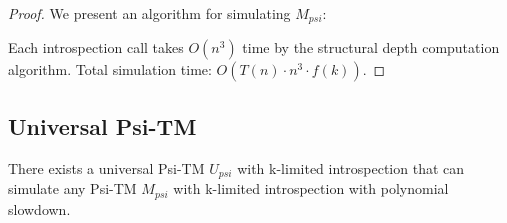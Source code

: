 \begin{proof}
We present an algorithm for simulating $M_{psi}$:

\begin{figure}[ht]
\end{figure}

Each introspection call takes $O(n^3)$ time by the structural depth computation algorithm. Total simulation time: $O(T(n) \cdot n^3 \cdot f(k))$.
\end{proof}

\subsection{Universal Psi-TM}

\begin{theorem}
There exists a universal Psi-TM $U_{psi}$ with k-limited introspection that can simulate any Psi-TM $M_{psi}$ with k-limited introspection with polynomial slowdown.
\end{theorem}

